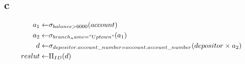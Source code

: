 \documentclass{article}
\begin{document}
    \subsection*{c}
    \begin{equation*}
        \begin{split}
            a_1\leftarrow & \sigma_{balance>6000}(account)\\
            a_2\leftarrow & \sigma_{branch_name="Uptown"}(a_1)\\
            d\leftarrow & \sigma_{depositor.account\_number=account.account\_number}(depositor\times a_2)\\
            reslut\leftarrow & \Pi_{ID}(d)
        \end{split}
    \end{equation*}
\end{document}
